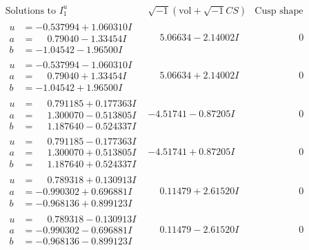 \documentclass[1p]{elsarticle_modified}
\theoremstyle{definition}
\newcommand{\I}{\sqrt{-1}}
\begin{document}
$$\begin{array}{c|c|c}
 \end{array}$$\newpage$$\begin{array}{c|c|c}  
\text{Solutions to }I^u_{1}& \I (\text{vol} + \sqrt{-1}CS) & \text{Cusp shape}\\
 \hline 
\begin{aligned}
u &= -0.537994 + 1.060310 I \\
a &= \phantom{-}0.79040 - 1.33454 I \\
b &= -1.04542 - 1.96500 I\end{aligned}
 & \phantom{-}5.06634 - 2.14002 I & \phantom{-0.000000 } 0 \\ \hline\begin{aligned}
u &= -0.537994 - 1.060310 I \\
a &= \phantom{-}0.79040 + 1.33454 I \\
b &= -1.04542 + 1.96500 I\end{aligned}
 & \phantom{-}5.06634 + 2.14002 I & \phantom{-0.000000 } 0 \\ \hline\begin{aligned}
u &= \phantom{-}0.791185 + 0.177363 I \\
a &= \phantom{-}1.300070 - 0.513805 I \\
b &= \phantom{-}1.187640 - 0.524337 I\end{aligned}
 & -4.51741 - 0.87205 I & \phantom{-0.000000 } 0 \\ \hline\begin{aligned}
u &= \phantom{-}0.791185 - 0.177363 I \\
a &= \phantom{-}1.300070 + 0.513805 I \\
b &= \phantom{-}1.187640 + 0.524337 I\end{aligned}
 & -4.51741 + 0.87205 I & \phantom{-0.000000 } 0 \\ \hline\begin{aligned}
u &= \phantom{-}0.789318 + 0.130913 I \\
a &= -0.990302 + 0.696881 I \\
b &= -0.968136 + 0.899123 I\end{aligned}
 & \phantom{-}0.11479 + 2.61520 I & \phantom{-0.000000 } 0 \\ \hline\begin{aligned}
u &= \phantom{-}0.789318 - 0.130913 I \\
a &= -0.990302 - 0.696881 I \\
b &= -0.968136 - 0.899123 I\end{aligned}
 & \phantom{-}0.11479 - 2.61520 I & \phantom{-0.000000 } 0 \\ \hline\begin{aligned}

\end{aligned}
\end{array}$$
\end{document}

